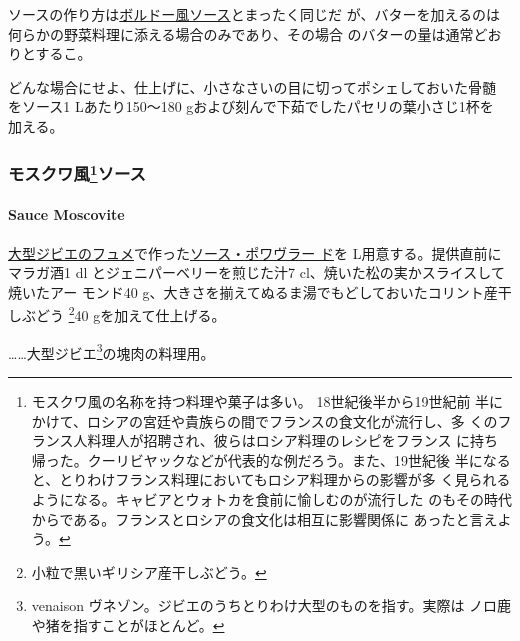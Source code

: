 \begin{recette}
  

ソースの作り方は\protect\hyperlink{sauce-bordelaise}{ボルドー風ソース}とまったく同じだ
が、バターを加えるのは何らかの野菜料理に添える場合のみであり、その場合
のバターの量は通常どおりとするこ。

どんな場合にせよ、仕上げに、小さなさいの目に切ってポシェしておいた骨髄
をソース1 Lあたり150〜180 gおよび刻んで下茹でしたパセリの葉小さじ1杯を
加える。

\maeaki

\hypertarget{ux30e2ux30b9ux30afux30efux98a856ux30bdux30fcux30b9}{%
\subsubsection[モスクワ風ソース]{\texorpdfstring{モスクワ風\footnote{モスクワ風の名称を持つ料理や菓子は多い。
  18世紀後半から19世紀前
  半にかけて、ロシアの宮廷や貴族らの間でフランスの食文化が流行し、多
  くのフランス人料理人が招聘され、彼らはロシア料理のレシピをフランス
  に持ち帰った。クーリビヤックなどが代表的な例だろう。また、19世紀後
  半になると、とりわけフランス料理においてもロシア料理からの影響が多
  く見られるようになる。キャビアとウォトカを食前に愉しむのが流行した
  のもその時代からである。フランスとロシアの食文化は相互に影響関係に
  あったと言えよう。}ソース}{モスクワ風ソース}}\label{ux30e2ux30b9ux30afux30efux98a856ux30bdux30fcux30b9}}

\hypertarget{sauce-moscovite}{%
\paragraph{Sauce Moscovite}\label{sauce-moscovite}}

   

\protect\hyperlink{fonds-de-gibier}{大型ジビエのフュメ}で作った\protect\hyperlink{sauce-poivrade}{ソース・ポワヴラー
ド}を\troisquarts{} L用意する。提供直前にマラガ酒1 dl
とジェニパーベリーを煎じた汁7 cl、焼いた松の実かスライスして焼いたアー
モンド40 g、大きさを揃えてぬるま湯でもどしておいたコリント産干しぶどう
\footnote{小粒で黒いギリシア産干しぶどう。}40 gを加えて仕上げる。

\ldots{}\ldots{}大型ジビエ\footnote{venaison
  ヴネゾン。ジビエのうちとりわけ大型のものを指す。実際は
  ノロ鹿や猪を指すことがほとんど。}の塊肉の料理用。


\end{recette}
